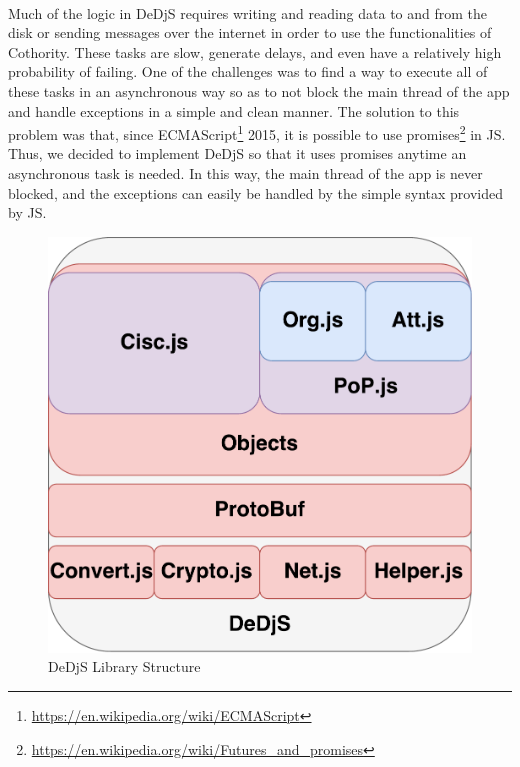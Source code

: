 \paragraph{}
Much of the logic in DeDjS requires writing and reading data to and from the disk or sending messages over the internet in order to use the functionalities of Cothority. These tasks are slow, generate delays, and even have a relatively high probability of failing. One of the challenges was to find a way to execute all of these tasks in an asynchronous way so as to not block the main thread of the app and handle exceptions in a simple and clean manner. The solution to this problem was that, since ECMAScript\footnote{\url{https://en.wikipedia.org/wiki/ECMAScript}} 2015, it is possible to use promises\footnote{\url{https://en.wikipedia.org/wiki/Futures_and_promises}} in JS. Thus, we decided to implement DeDjS so that it uses promises anytime an asynchronous task is needed. In this way, the main thread of the app is never blocked, and the exceptions can easily be handled by the simple syntax provided by JS.

\begin{figure}[h]
\includegraphics[scale=.3]{graphic/dedjs.pdf}
\centering
\caption{DeDjS Library Structure}
\end{figure}
